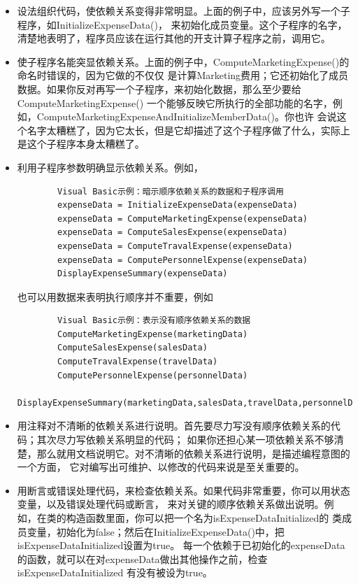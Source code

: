 \documentclass{article}
\begin{document}
\begin{itemize}
    \item 设法组织代码，使依赖关系变得非常明显。上面的例子中，应该另外写一个子程序，如InitializeExpenseData()，
    来初始化成员变量。这个子程序的名字，清楚地表明了，程序员应该在运行其他的开支计算子程序之前，调用它。
    \item 使子程序名能突显依赖关系。上面的例子中，ComputeMarketingExpense()的命名时错误的，因为它做的不仅仅
    是计算Marketing费用；它还初始化了成员数据。如果你反对再写一个子程序，来初始化数据，那么至少要给ComputeMarketingExpense()
    一个能够反映它所执行的全部功能的名字，例如，ComputeMarketingExpenseAndInitializeMemberData()。你也许
    会说这个名字太糟糕了，因为它太长，但是它却描述了这个子程序做了什么，实际上是这个子程序本身太糟糕了。
    \item 利用子程序参数明确显示依赖关系。例如，
    \begin{lstlisting}
        Visual Basic示例：暗示顺序依赖关系的数据和子程序调用
        expenseData = InitializeExpenseData(expenseData)
        expenseData = ComputeMarketingExpense(expenseData)
        expenseData = ComputeSalesExpense(expenseData)
        expenseData = ComputeTravalExpense(expenseData)
        expenseData = ComputePersonnelExpense(expenseData)
        DisplayExpenseSummary(expenseData)
    \end{lstlisting}
    也可以用数据来表明执行顺序并不重要，例如
    \begin{lstlisting}
        Visual Basic示例：表示没有顺序依赖关系的数据
        ComputeMarketingExpense(marketingData)
        ComputeSalesExpense(salesData)
        ComputeTravalExpense(travelData)
        ComputePersonnelExpense(personnelData)
        DisplayExpenseSummary(marketingData,salesData,travelData,personnelData)
    \end{lstlisting}
    \item 用注释对不清晰的依赖关系进行说明。首先要尽力写没有顺序依赖关系的代码；其次尽力写依赖关系明显的代码；
    如果你还担心某一项依赖关系不够清楚，那么就用文档说明它。对不清晰的依赖关系进行说明，是描述编程意图的一个方面，
    它对编写出可维护、以修改的代码来说是至关重要的。
    \item 用断言或错误处理代码，来检查依赖关系。如果代码非常重要，你可以用状态变量，以及错误处理代码或断言，
    来对关键的顺序依赖关系做出说明。例如，在类的构造函数里面，你可以把一个名为isExpenseDataInitialized的
    类成员变量，初始化为false；然后在InitializeExpenseData()中，把isExpenseDataInitialized设置为true。
    每一个依赖于已初始化的expenseData的函数，就可以在对expenseData做出其他操作之前，检查isExpenseDataInitialized
    有没有被设为true。
\end{itemize}
\end{document}
